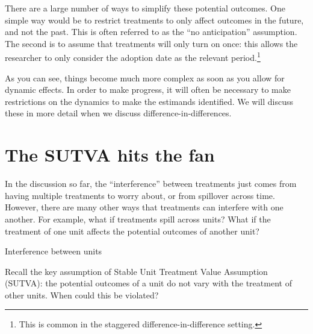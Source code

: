 \documentclass{tufte-handout}
\theoremstyle{break}
\begin{document}
There are a large number of ways to simplify these potential outcomes. One simple way would be to restrict treatments to only affect outcomes in the future, and not the past. This is often referred to as the ``no anticipation'' assumption. The second is to assume that treatments will only turn on once: this allows the researcher to only consider the adoption date as the relevant period.\footnote{This is common in the staggered difference-in-difference setting.} 

As you can see, things become much more complex as soon as you allow for dynamic effects. In order to make progress, it will often be necessary to make restrictions on the dynamics to make the estimands identified. We will discuss these in more detail when we discuss difference-in-differences.

\section{The SUTVA hits the fan}

In the discussion so far, the ``interference'' between treatments just comes from having multiple treatments to worry about, or from spillover across time. However, there are many other ways that treatments can interfere with one another. For example, what if treatments spill across units? What if the treatment of one unit affects the potential outcomes of another unit?

\begin{marginfigure}
  
  \caption{Interference between units}
  \label{fig:interference}
\end{marginfigure}
Recall the key assumption of Stable Unit Treatment Value Assumption (SUTVA): the potential outcomes of a unit do not vary with the treatment of other units. When could this be violated?
\end{document}
